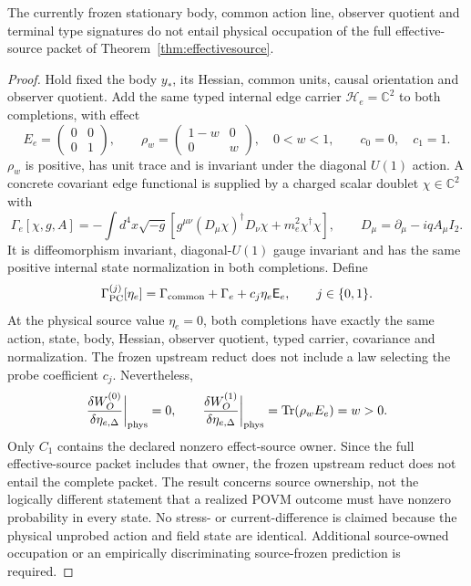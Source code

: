 \begin{proposition}
\label{prop:samereduct}
The currently frozen stationary body, common action line, observer quotient
and terminal type signatures do not entail physical occupation of the full
effective-source packet of Theorem~\ref{thm:effectivesource}.
\end{proposition}
\begin{proof}
Hold fixed the body $y_*$, its Hessian, common units, causal orientation and
observer quotient.  Add the same typed internal edge carrier
$\mathcal H_e=\mathbb C^2$ to both completions, with effect
\begin{equation}
E_e=\begin{pmatrix}0&0\\0&1\end{pmatrix},\qquad
\rho_w=\begin{pmatrix}1-w&0\\0&w\end{pmatrix},
\quad 0<w<1,\qquad c_0=0,\quad c_1=1.
\label{eq:counterpair}
\end{equation}
$\rho_w$ is positive, has unit trace and is invariant under the diagonal
$U(1)$ action.  A concrete covariant edge functional is supplied by
a charged scalar doublet $\chi\in\mathbb C^2$ with
\begin{equation}
\Gamma_e[\chi,g,A]
=-\int d^4x\sqrt{-g}\left[
g^{\mu\nu}(D_\mu\chi)^\dagger D_\nu\chi
+m_e^2\chi^\dagger\chi\right],
\qquad D_\mu=\partial_\mu-iqA_\mu I_2 .
\label{eq:counteredgeaction}
\end{equation}
It is diffeomorphism invariant, diagonal-$U(1)$ gauge invariant and has the
same positive internal state normalization in both completions.  Define
\begin{equation}
\Gamma_{\rm PC}^{(j)}[\eta_e]
=\Gamma_{\rm common}+\Gamma_e+c_j\eta_e\mathsf E_e,
\qquad j\in\{0,1\}.
\label{eq:counterprobes}
\end{equation}
At the physical source value $\eta_e=0$, both completions have exactly the
same action, state, body, Hessian, observer quotient, typed carrier,
covariance and normalization.  The frozen upstream reduct does not include a
law selecting the probe coefficient $c_j$.  Nevertheless,
\begin{equation}
\frac{\delta W_O^{(0)}}{\delta\eta_{e,\Delta}}\bigg|_{\rm phys}=0,
\qquad
\frac{\delta W_O^{(1)}}{\delta\eta_{e,\Delta}}\bigg|_{\rm phys}
=\operatorname{Tr}(\rho_wE_e)=w>0.
\end{equation}
Only $C_1$ contains the declared nonzero effect-source owner.  Since the full
effective-source packet includes that owner, the frozen upstream reduct does
not entail the complete packet.  The result concerns source ownership, not
the logically different statement that a realized POVM outcome must have
nonzero probability in every state.  No stress- or current-difference is
claimed because the physical unprobed action and field state are identical.
Additional source-owned occupation or an empirically discriminating
source-frozen prediction is required.
\end{proof}

